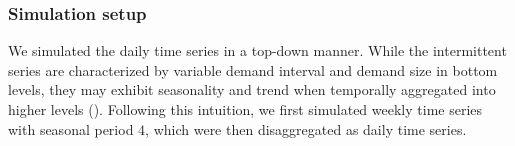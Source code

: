 \documentclass[a4paper,review,12pt,authoryear]{elsarticle}
\let\code=\texttt
\let\proglang=\textsf
\begin{document}




  

\subsubsection{Simulation setup}

We simulated the daily time series in a top-down manner. 
While the intermittent series are characterized by variable demand interval and demand size in bottom levels, they may exhibit seasonality and trend when temporally aggregated into higher levels ().
Following this intuition, we first simulated weekly time series with seasonal period $4$, which were then disaggregated as daily time series.
\end{document}
